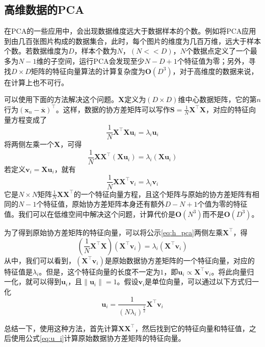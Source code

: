 \documentclass[11pt]{ctexbook}
\begin{document}
\subsection{高维数据的PCA}
在PCA的一些应用中，会出现数据维度远大于数据样本的个数。例如将PCA应用到由几百张图片构成的数据集合，此时，每个图片的维度为几百万维，远大于样本个数。若数据维度为$D$，样本个数为$N$，$(N << D)$，$N$个数据点定义了一个最多为$N-1$维的子空间，运行PCA会发现至少$N-D+1$个特征值为零；另外，寻找$D\times D$矩阵的特征向量算法的计算复杂度为$\bm O(D^3)$，对于高维度的数据来说，在计算上也不可行。

可以使用下面的方法解决这个问题。$\bm X$定义为$(D\times D)$维中心数据矩阵，它的第$n$行为$(\bm x_n - \overline{\bm x})^\top$。这样，数据的协方差矩阵可以写作$\bm S = \frac{1}{N}\bm X^\top \bm X$，对应的特征向量方程变成了
\begin{equation}
	\frac{1}{N}\bm X^\top \bm X\bm u_i = \lambda_i\bm u_i
\end{equation}
将两侧左乘一个$\bm X$，可得
\begin{equation}
	\frac{1}{N}\bm X \bm X^\top(\bm X\bm u_i) = \lambda_i(\bm X\bm u_i)
\end{equation}
若定义$\bm v_i = \bm X\bm u_i$，就有
\begin{equation}
\label{eq:h_pca}
	\frac{1}{N}\bm X\bm X^\top\bm v_i = \lambda_i\bm v_i
\end{equation}
它是$N\times N$矩阵$\frac{1}{N}\bm X\bm X^\top$的一个特征向量方程，且这个矩阵与原始的协方差矩阵有相同的$N-1$个特征值，原始协方差矩阵本身还有额外$D-N+1$个值为零的特征值。我们可以在低维空间中解决这个问题，计算代价是$\bm O(N^3)$而不是$\bm O(D^3)$。

为了得到原始协方差矩阵的特征向量，可以将公示\ref{eq:h_pca}两侧左乘$\bm X^\top$，得
\begin{equation}
	(\frac{1}{N}\bm X^\top\bm X)(\bm X^\top\bm v_i) = \lambda_i(\bm X^\top\bm v_i)
\end{equation}
从中，我们可以看到，$(\bm X^\top \bm v_i)$是原始数据协方差矩阵的一个特征向量，对应的特征值是$\lambda_i$。但是，这个特征向量的长度不一定为$1$，即$\bm u_i \propto \bm X^\top \bm v_i$。将此向量归一化，就可以得到$\bm u_i$，且$\|\bm u_i\|=1$。假设$\bm v_i$是单位向量，可以通过以下方式归一化
\begin{equation}
	\label{eq:u_i}
	\bm u_i = \frac{1}{(N\lambda_i)^\frac{1}{2}}\bm X^\top\bm v_i
\end{equation}

总结一下，使用这种方法，首先计算$\bm X \bm X^\top$，然后找到它的特征向量和特征值，之后使用公式\ref{eq:u_i}计算原始数据协方差矩阵的特征向量。
\end{document}
